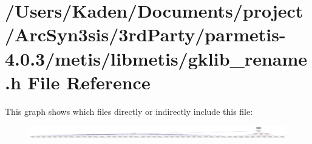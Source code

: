 \hypertarget{a00212}{}\section{/\+Users/\+Kaden/\+Documents/project/\+Arc\+Syn3sis/3rd\+Party/parmetis-\/4.0.3/metis/libmetis/gklib\+\_\+rename.h File Reference}
\label{a00212}
This graph shows which files directly or indirectly include this file\+:\nopagebreak
\begin{figure}[H]
\begin{center}
\leavevmode
\includegraphics[width=350pt]{a00214}
\end{center}
\end{figure}
